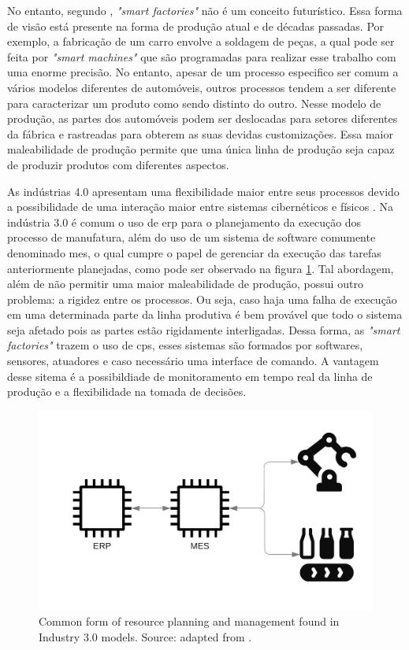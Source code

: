 No entanto, segundo \textcite{Gilchrist2016}, \emph{"smart factories"} não é um conceito futurístico. Essa forma de visão está presente na forma de produção atual e de décadas passadas. Por exemplo,  a fabricação de um carro envolve a soldagem de peças, a qual pode ser feita por \emph{"smart machines"} que são programadas para realizar esse trabalho com uma enorme precisão. No entanto, apesar de um processo especifico ser comum a vários modelos diferentes de automóveis, outros processos tendem a ser diferente para caracterizar um produto como sendo distinto do outro. Nesse modelo de produção, as partes dos automóveis podem ser deslocadas para setores diferentes da fábrica e rastreadas para obterem as suas devidas customizações. Essa maior maleabilidade de produção permite que uma única linha de produção seja capaz de produzir produtos com diferentes aspectos.

As indústrias 4.0 apresentam uma flexibilidade maior entre seus processos devido a possibilidade de uma interação maior entre sistemas cibernéticos e físicos \cite{Gilchrist2016}. Na indústria 3.0 é comum o uso de  \acrfull{erp} para o planejamento da execução dos processo de manufatura, além do uso de um sistema de software comumente denominado \acrfull{mes}, o qual cumpre o papel de gerenciar da execução das tarefas anteriormente planejadas, como pode ser observado na figura \ref{fig:erp}. Tal abordagem, além de não permitir uma maior maleabilidade de produção, possui outro problema: a rigidez entre os processos. Ou seja, caso haja uma falha de execução em uma determinada parte da linha produtiva é bem provável que todo o sistema seja afetado pois as partes estão rigidamente interligadas. Dessa forma, as \emph{"smart factories"} trazem o uso de \acrfull{cps}, esses sistemas são formados por softwares, sensores, atuadores e caso necessário uma interface de comando. A vantagem desse sitema é a possibildiade de monitoramento em tempo real da linha de produção e a flexibilidade na tomada de decisões.
\begin{figure}[h!]
    \centering
    \includegraphics[scale=0.2]{images/Related/ERP.png}
    \caption{Common form of resource planning and management found in Industry 3.0 models. Source: adapted from \cite{Gilchrist2016}.}

    \label{fig:erp}
\end{figure}

